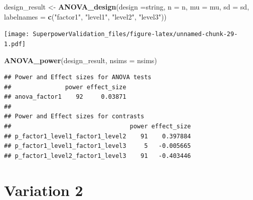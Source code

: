 \documentclass[]{book}
\newenvironment{Shaded}{\begin{snugshade}}{\end{snugshade}}
\newcommand{\DataTypeTok}[1]{\textcolor[rgb]{0.13,0.29,0.53}{#1}}
\newcommand{\KeywordTok}[1]{\textcolor[rgb]{0.13,0.29,0.53}{\textbf{#1}}}
\newcommand{\NormalTok}[1]{#1}
\newcommand{\StringTok}[1]{\textcolor[rgb]{0.31,0.60,0.02}{#1}}
\begin{document}
\begin{Shaded}
\begin{Highlighting}[]
\NormalTok{design_result <-}\StringTok{ }\KeywordTok{ANOVA_design}\NormalTok{(}\DataTypeTok{design =}\NormalTok{string,}
                   \DataTypeTok{n =}\NormalTok{ n, }
                   \DataTypeTok{mu =}\NormalTok{ mu, }
                   \DataTypeTok{sd =}\NormalTok{ sd, }
                   \DataTypeTok{labelnames =} \KeywordTok{c}\NormalTok{(}\StringTok{"factor1"}\NormalTok{, }\StringTok{"level1"}\NormalTok{, }\StringTok{"level2"}\NormalTok{, }\StringTok{"level3"}\NormalTok{))}
\end{Highlighting}
\end{Shaded}

\texttt{[image: SuperpowerValidation\_files/figure-latex/unnamed-chunk-29-1.pdf]}

\begin{Shaded}
\begin{Highlighting}[]
\KeywordTok{ANOVA_power}\NormalTok{(design_result, }\DataTypeTok{nsims =}\NormalTok{ nsims)}
\end{Highlighting}
\end{Shaded}

\begin{verbatim}
## Power and Effect sizes for ANOVA tests
##               power effect_size
## anova_factor1    92     0.03871
## 
## Power and Effect sizes for contrasts
##                                 power effect_size
## p_factor1_level1_factor1_level2    91    0.397884
## p_factor1_level1_factor1_level3     5   -0.005665
## p_factor1_level2_factor1_level3    91   -0.403446
\end{verbatim}

\hypertarget{variation-2}{%
\section{Variation 2}\label{variation-2}}
\end{document}
